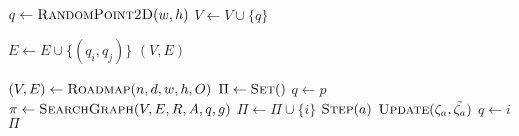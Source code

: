\begin{algorithm}[ht]
    \caption{$\Function{Roadmap}(n, d, w, h, O)$}
    \\
    \label{algo:PRM}
    \begin{algorithmic}[1]
        \setcounter{ALC@line}{0}
        \vspace*{1mm}

            \STATE $q \leftarrow \Function{RandomPoint2D}(w, h)$
                \STATE $V \leftarrow V \cup \{q\}$
            \ENDIF
        \ENDFOR

                    \STATE $E \leftarrow E \cup \{(q_i, q_j)\}$
                \ENDIF
            \ENDFOR
        \ENDFOR
        \RETURN $(V,E)$
    \end{algorithmic}
\end{algorithm}

\begin{algorithm}[ht]
    \caption{$\Function{GetPath}(n, d, w, h, \delta, p, g, O, A, R)$}
    \label{algo:path}
    \begin{algorithmic}[1]
        \setcounter{ALC@line}{0}
        \STATE $(V, E) \leftarrow \Function{Roadmap}(n, d, w, h, O)$
        \STATE $\Pi \leftarrow \Function{Set}()$
        \STATE $q \leftarrow p$
            \STATE $\pi \leftarrow \Function{SearchGraph}(V, E, R, A, q, g)$
                \STATE $\Pi \leftarrow \Pi \cup \{i\}$
                    \STATE $\Function{Step}(a)$
                \ENDFOR
                        \STATE $\Function{Update}(\zeta_a, \tilde{\zeta_a})$
                    \ENDFOR
                    \STATE $q \leftarrow i$
                \ENDIF
            \ENDFOR
        \ENDWHILE
        \RETURN $\Pi$
    \end{algorithmic}
\end{algorithm}

